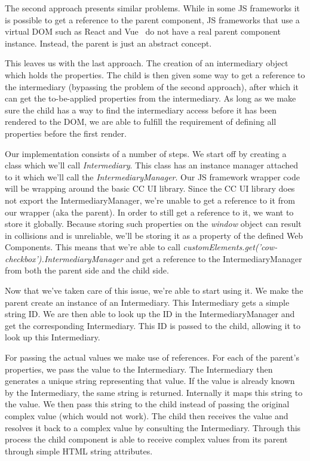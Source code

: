 {	The second approach presents similar problems. While in some JS frameworks it is possible to get a reference to the parent component, JS frameworks that use a virtual DOM such as React and Vue~ do not have a real parent component instance. Instead, the parent is just an abstract concept.

	This leaves us with the last approach. The creation of an intermediary object which holds the properties. The child is then given some way to get a reference to the intermediary (bypassing the problem of the second approach), after which it can get the to-be-applied properties from the intermediary. As long as we make sure the child has a way to find the intermediary access before it has been rendered to the DOM, we are able to fulfill the requirement of defining all properties before the first render.
}{
	Our implementation consists of a number of steps. We start off by creating a class which we'll call \emph{Intermediary}. This class has an instance manager attached to it which we'll call the \emph{IntermediaryManager}. Our JS framework wrapper code will be wrapping around the basic CC UI library. Since the CC UI library does not export the IntermediaryManager, we're unable to get a reference to it from our wrapper (aka the parent). In order to still get a reference to it, we want to store it globally. Because storing such properties on the \emph{window} object can result in collisions and is unreliable, we'll be storing it as a property of the defined Web Components. This means that we're able to call \emph{customElements.get('cow-checkbox').IntermediaryManager} and get a reference to the IntermediaryManager from both the parent side and the child side.

	Now that we've taken care of this issue, we're able to start using it. We make the parent create an instance of an Intermediary. This Intermediary gets a simple string ID\@. We are then able to look up the ID in the IntermediaryManager and get the corresponding Intermediary. This ID is passed to the child, allowing it to look up this Intermediary.

	For passing the actual values we make use of references. For each of the parent's properties, we pass the value to the Intermediary. The Intermediary then generates a unique string representing that value. If the value is already known by the Intermediary, the same string is returned. Internally it maps this string to the value. We then pass this string to the child instead of passing the original complex value (which would not work). The child then receives the value and resolves it back to a complex value by consulting the Intermediary. Through this process the child component is able to receive complex values from its parent through simple HTML string attributes.
}

